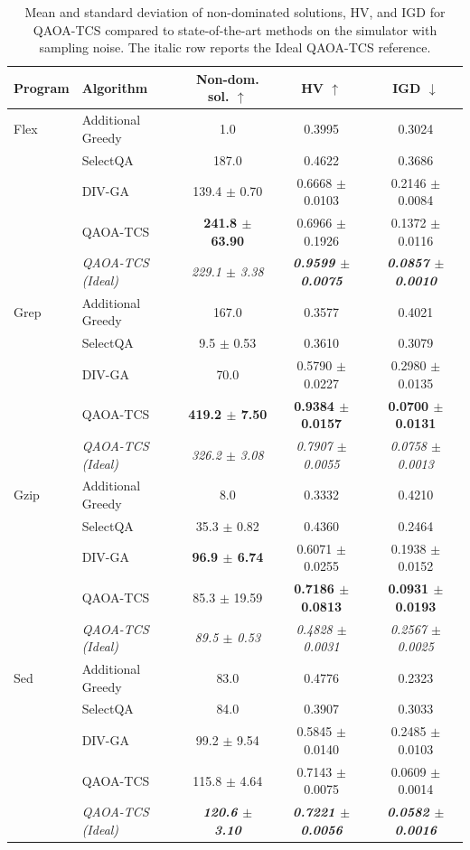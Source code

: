 \begin{table}[ht]
\centering
\scriptsize
\setlength{\tabcolsep}{3pt}
\caption{Mean and standard deviation of non-dominated solutions, HV, and IGD for QAOA-TCS compared to state-of-the-art methods on the simulator with sampling noise. The italic row reports the Ideal QAOA-TCS reference.}
\label{tab:samplenoise_means}
\begin{tabular}{llccc}
\toprule
\textbf{Program} & \textbf{Algorithm} & \textbf{Non-dom. sol.} $\uparrow$ & \textbf{HV} $\uparrow$ & \textbf{IGD} $\downarrow$ \\
\midrule
Flex & Additional Greedy & 1.0 & 0.3995 & 0.3024 \\
 & SelectQA & 187.0 & 0.4622 & 0.3686 \\
 & DIV-GA & 139.4 $\pm$ 0.70 & 0.6668 $\pm$ 0.0103 & 0.2146 $\pm$ 0.0084 \\
 & QAOA-TCS & \textbf{241.8 $\pm$ 63.90} & 0.6966 $\pm$ 0.1926 & 0.1372 $\pm$ 0.0116 \\
 & \textit{QAOA-TCS (Ideal)} & \textit{229.1 $\pm$ 3.38} & \textbf{\textit{0.9599 $\pm$ 0.0075}} & \textbf{\textit{0.0857 $\pm$ 0.0010}} \\
\midrule
Grep & Additional Greedy & 167.0 & 0.3577 & 0.4021 \\
 & SelectQA & 9.5 $\pm$ 0.53 & 0.3610 & 0.3079 \\
 & DIV-GA & 70.0 & 0.5790 $\pm$ 0.0227 & 0.2980 $\pm$ 0.0135 \\
 & QAOA-TCS & \textbf{419.2 $\pm$ 7.50} & \textbf{0.9384 $\pm$ 0.0157} & \textbf{0.0700 $\pm$ 0.0131} \\
 & \textit{QAOA-TCS (Ideal)} & \textit{326.2 $\pm$ 3.08} & \textit{0.7907 $\pm$ 0.0055} & \textit{0.0758 $\pm$ 0.0013} \\
\midrule
Gzip & Additional Greedy & 8.0 & 0.3332 & 0.4210 \\
 & SelectQA & 35.3 $\pm$ 0.82 & 0.4360 & 0.2464 \\
 & DIV-GA & \textbf{96.9 $\pm$ 6.74} & 0.6071 $\pm$ 0.0255 & 0.1938 $\pm$ 0.0152 \\
 & QAOA-TCS & 85.3 $\pm$ 19.59 & \textbf{0.7186 $\pm$ 0.0813} & \textbf{0.0931 $\pm$ 0.0193} \\
 & \textit{QAOA-TCS (Ideal)} & \textit{89.5 $\pm$ 0.53} & \textit{0.4828 $\pm$ 0.0031} & \textit{0.2567 $\pm$ 0.0025} \\
\midrule
Sed & Additional Greedy & 83.0 & 0.4776 & 0.2323 \\
 & SelectQA & 84.0 & 0.3907 & 0.3033 \\
 & DIV-GA & 99.2 $\pm$ 9.54 & 0.5845 $\pm$ 0.0140 & 0.2485 $\pm$ 0.0103 \\
 & QAOA-TCS & 115.8 $\pm$ 4.64 & 0.7143 $\pm$ 0.0075 & 0.0609 $\pm$ 0.0014 \\
 & \textit{QAOA-TCS (Ideal)} & \textbf{\textit{120.6 $\pm$ 3.10}} & \textbf{\textit{0.7221 $\pm$ 0.0056}} & \textbf{\textit{0.0582 $\pm$ 0.0016}} \\
\bottomrule
\end{tabular}%
\end{table}

